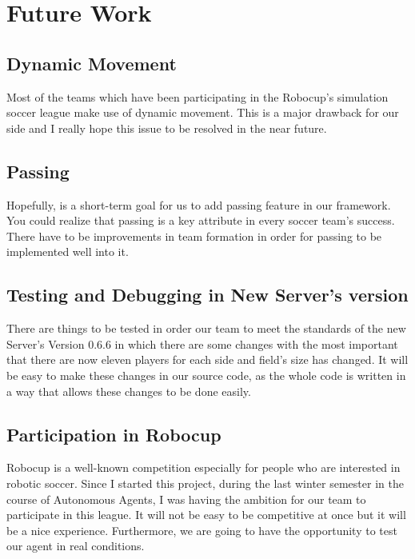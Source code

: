 \chapter{Future Work}
\label{future}
\section{Dynamic Movement}
Most of the teams which have been participating in the Robocup's simulation soccer league make use of dynamic movement. This is a major drawback for our side and I really hope this issue to be resolved in the near future.
\section{Passing}
Hopefully, is a short-term goal for us to add passing feature in our framework. You could realize that passing is a key attribute in every soccer team's success. There have to be improvements in team formation in order for passing to be implemented well into it.
\section{Testing and Debugging in New Server's version}
There are things to be tested in order our team to meet the standards of the new Server's Version 0.6.6 in which there are some changes with the most important that there are now eleven players for each side and field's size has changed. It will be easy to make these changes in our source code, as the whole code is written in a way that allows these changes to be done easily.
\section{Participation in Robocup}
Robocup is a well-known competition especially for people who are interested in robotic soccer. Since I started this project, during the last winter semester in the course of Autonomous Agents, I was having the ambition for our team to participate in this league. It will not be easy to be competitive at once but it will be a nice experience. Furthermore, we are going to have the opportunity to test our agent in real conditions.
